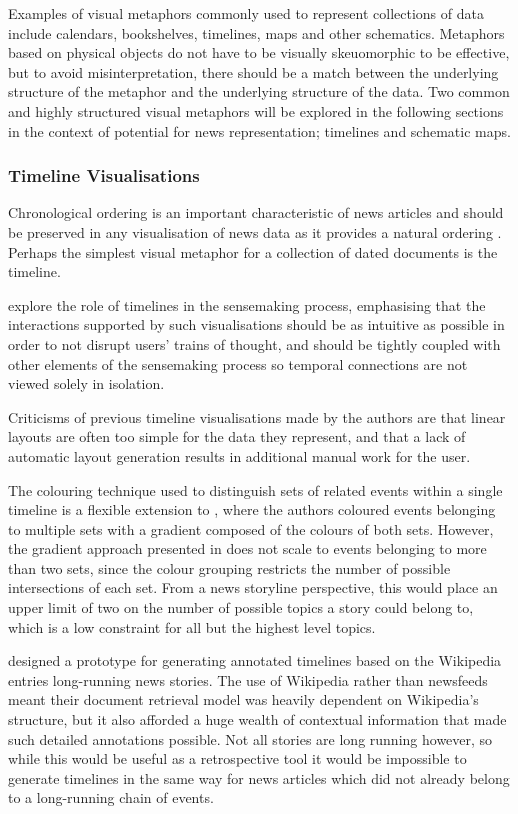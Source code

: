 Examples of visual metaphors commonly used to represent collections of data include calendars, bookshelves, timelines, maps and other schematics. Metaphors based on physical objects do not have to be visually skeuomorphic to be effective, but to avoid misinterpretation, there should be a match between the underlying structure of the metaphor and the underlying structure of the data. Two common and highly structured visual metaphors will be explored in the following sections in the context of potential for news representation; timelines and schematic maps.

\subsubsection{Timeline Visualisations}

Chronological ordering is an important characteristic of news articles and should be preserved in any visualisation of news data as it provides a natural ordering \citep{StructuredSummarizationForNewsEvents}. Perhaps the simplest visual metaphor for a collection of dated documents is the timeline.

\cite{SchemaLine} explore the role of timelines in the sensemaking process,  emphasising that the interactions supported by such visualisations should be as intuitive as possible in order to not disrupt users' trains of thought, and should be tightly coupled with other elements of the sensemaking process so temporal connections are not viewed solely in isolation.

Criticisms of previous timeline visualisations made by the authors are that linear layouts  are often too simple for the data they represent, and that a lack of automatic layout generation results in additional manual work for the user.

The colouring technique used to distinguish sets of related events within a single timeline is a flexible extension to \citep{TimeSets}, where the authors coloured events belonging to multiple sets with a gradient composed of the colours of both sets. However, the gradient approach presented in \citep{SchemaLine} does not scale to events belonging to more than two sets, since the colour grouping restricts the number of possible intersections of each set. From a news storyline perspective, this would place an upper limit of two on the number of possible topics a story could belong to, which is a low constraint for all but the highest level topics.

\citet{ExploringLongRunningNewsStoriesUsingWikipedia} designed a prototype for generating annotated timelines based on the Wikipedia entries long-running news stories. The use of Wikipedia rather than newsfeeds meant their document retrieval model was heavily dependent on Wikipedia's structure, but it also afforded a huge wealth of contextual information that made such detailed annotations possible. Not all stories are long running however, so while this would be useful as a retrospective tool it would be impossible to generate timelines in the same way for news articles which did not already belong to a long-running chain of events.


